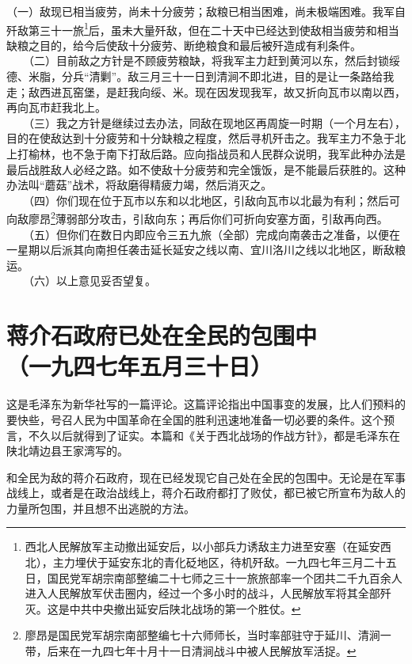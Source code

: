 \documentclass[cn,11pt,chinese]{elegantbook}
\def\myformat#1{\hfil\hfil #1}
\begin{document}
（一）敌现已相当疲劳，尚未十分疲劳；敌粮已相当困难，尚未极端困难。我军自歼敌第三十一旅\footnote[1]{ 西北人民解放军主动撤出延安后，以小部兵力诱敌主力进至安塞（在延安西北），主力埋伏于延安东北的青化砭地区，待机歼敌。一九四七年三月二十五日，国民党军胡宗南部整编二十七师之三十一旅旅部率一个团共二千九百余人进入人民解放军伏击圈内，经过一个多小时的战斗，人民解放军将其全部歼灭。这是中共中央撤出延安后陕北战场的第一个胜仗。}后，虽未大量歼敌，但在二十天中已经达到使敌相当疲劳和相当缺粮之目的，给今后使敌十分疲劳、断绝粮食和最后被歼造成有利条件。\\
　　（二）目前敌之方针是不顾疲劳粮缺，将我军主力赶到黄河以东，然后封锁绥德、米脂，分兵“清剿”。敌三月三十一日到清涧不即北进，目的是让一条路给我走；敌西进瓦窑堡，是赶我向绥、米。现在因发现我军，故又折向瓦市以南以西，再向瓦市赶我北上。\\
　　（三）我之方针是继续过去办法，同敌在现地区再周旋一时期（一个月左右），目的在使敌达到十分疲劳和十分缺粮之程度，然后寻机歼击之。我军主力不急于北上打榆林，也不急于南下打敌后路。应向指战员和人民群众说明，我军此种办法是最后战胜敌人必经之路。如不使敌十分疲劳和完全饿饭，是不能最后获胜的。这种办法叫“蘑菇”战术，将敌磨得精疲力竭，然后消灭之。\\
　　（四）你们现在位于瓦市以东和以北地区，引敌向瓦市以北最为有利；然后可向敌廖昂\footnote[2]{ 廖昂是国民党军胡宗南部整编七十六师师长，当时率部驻守于延川、清涧一带，后来在一九四七年十月十一日清涧战斗中被人民解放军活捉。}薄弱部分攻击，引敌向东；再后你们可折向安塞方面，引敌再向西。\\
　　（五）但你们在数日内即应令三五九旅（全部）完成向南袭击之准备，以便在一星期以后派其向南担任袭击延长延安之线以南、宜川洛川之线以北地区，断敌粮运。\\
　　（六）以上意见妥否望复。\\
\newpage\section*{\myformat{蒋介石政府已处在全民的包围中}\\\myformat{（一九四七年五月三十日）}}
\begin{introduction}\item  这是毛泽东为新华社写的一篇评论。这篇评论指出中国事变的发展，比人们预料的要快些，号召人民为中国革命在全国的胜利迅速地准备一切必要的条件。这个预言，不久以后就得到了证实。本篇和《关于西北战场的作战方针》，都是毛泽东在陕北靖边县王家湾写的。\end{introduction}
和全民为敌的蒋介石政府，现在已经发现它自己处在全民的包围中。无论是在军事战线上，或者是在政治战线上，蒋介石政府都打了败仗，都已被它所宣布为敌人的力量所包围，并且想不出逃脱的方法。\\
\end{document}
